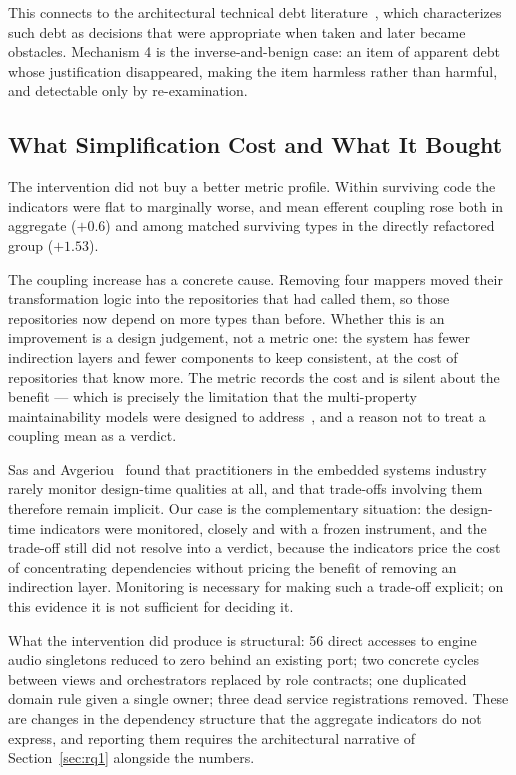 \documentclass{sbc2019}%
\begin{document}
This connects to the architectural technical debt literature~\cite{verdecchia2020,verdecchia2021}, which characterizes such debt as decisions
that were appropriate when taken and later became obstacles. Mechanism 4 is the
inverse-and-benign case: an item of apparent debt whose justification
disappeared, making the item harmless rather than harmful, and detectable only
by re-examination.

\subsection{What Simplification Cost and What It Bought}

The intervention did not buy a better metric profile. Within surviving code the
indicators were flat to marginally worse, and mean efferent coupling rose both
in aggregate ($+0.6$) and among matched surviving types in the directly
refactored group ($+1.53$).

The coupling increase has a concrete cause. Removing four mappers moved their
transformation logic into the repositories that had called them, so those
repositories now depend on more types than before. Whether this is an
improvement is a design judgement, not a metric one: the system has fewer
indirection layers and fewer components to keep consistent, at the cost of
repositories that know more. The metric records the cost and is silent about the
benefit --- which is precisely the limitation that the multi-property
maintainability models were designed to address~\cite{heitlager2007,baggen2012},
and a reason not to treat a coupling mean as a verdict.

Sas and Avgeriou~\cite{sas2020} found that practitioners in the embedded systems
industry rarely monitor design-time qualities at all, and that trade-offs
involving them therefore remain implicit. Our case is the complementary
situation: the design-time indicators were monitored, closely and with a frozen
instrument, and the trade-off still did not resolve into a verdict, because the
indicators price the cost of concentrating dependencies without pricing the
benefit of removing an indirection layer. Monitoring is necessary for making such
a trade-off explicit; on this evidence it is not sufficient for deciding it.

What the intervention did produce is structural: 56 direct accesses to engine
audio singletons reduced to zero behind an existing port; two concrete cycles
between views and orchestrators replaced by role contracts; one duplicated
domain rule given a single owner; three dead service registrations removed. These
are changes in the dependency structure that the aggregate indicators do not
express, and reporting them requires the architectural narrative of
Section~\ref{sec:rq1} alongside the numbers.
\end{document}
